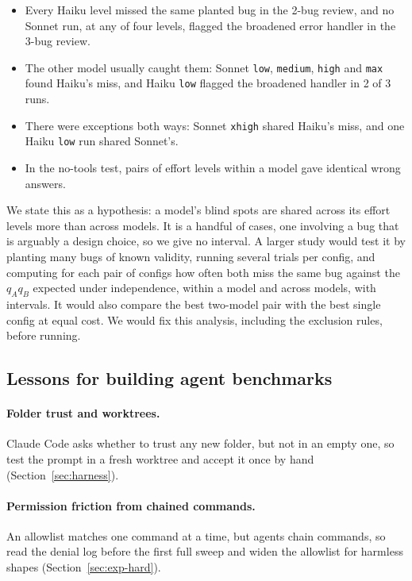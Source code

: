 \begin{itemize}[leftmargin=1.6em, itemsep=1pt]
  \item Every Haiku level missed the same planted bug in the 2-bug review, and no Sonnet run, at any of four levels, flagged the broadened error handler in the 3-bug review.
  \item The other model usually caught them: Sonnet \texttt{low}, \texttt{medium}, \texttt{high} and \texttt{max} found Haiku's miss, and Haiku \texttt{low} flagged the broadened handler in 2 of 3 runs.
  \item There were exceptions both ways: Sonnet \texttt{xhigh} shared Haiku's miss, and one Haiku \texttt{low} run shared Sonnet's.
  \item In the no-tools test, pairs of effort levels within a model gave identical wrong answers.
\end{itemize}

We state this as a hypothesis: a model's blind spots are shared across its effort levels more than across models. It is a handful of cases, one involving a bug that is arguably a design choice, so we give no interval. A larger study would test it by planting many bugs of known validity, running several trials per config, and computing for each pair of configs how often both miss the same bug against the $q_A q_B$ expected under independence, within a model and across models, with intervals. It would also compare the best two-model pair with the best single config at equal cost. We would fix this analysis, including the exclusion rules, before running.

\subsection{Lessons for building agent benchmarks}\label{sec:lessons}

\paragraph{Folder trust and worktrees.} Claude Code asks whether to trust any new folder, but not in an empty one, so test the prompt in a fresh worktree and accept it once by hand (Section~\ref{sec:harness}).

\paragraph{Permission friction from chained commands.} An allowlist matches one command at a time, but agents chain commands, so read the denial log before the first full sweep and widen the allowlist for harmless shapes (Section~\ref{sec:exp-hard}).


